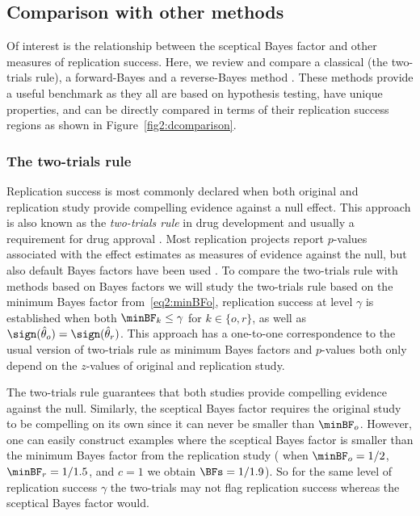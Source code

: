 \subsection{Comparison with other methods}
Of interest is the relationship between the sceptical Bayes factor and other
measures of replication success. Here, we review and compare a classical (the
two-trials rule), a forward-Bayes \citep[the replication Bayes factor
from][]{Verhagen2014} and a reverse-Bayes method \citep[the sceptical $p$-value
from][]{Held2020}. These methods provide a useful benchmark as they all are
based on hypothesis testing, have unique properties, and can be directly
compared in terms of their replication success regions as shown in
Figure~\ref{fig2:dcomparison}.


\subsubsection{The two-trials rule}
Replication success is most commonly declared when both original and replication
study provide compelling evidence against a null effect. This approach is also
known as the \emph{two-trials rule} in drug development and usually a
requirement for drug approval \citep[Section 9.4]{Kay2015}. Most replication
projects report $p$-values associated with the effect estimates as measures of
evidence against the null, but also default Bayes factors have been used
\citep[see \eg{} the Bayesian supplement of][]{Camerer2018}. To compare the
two-trials rule with methods based on Bayes factors we will study the two-trials
rule based on the minimum Bayes factor from~\eqref{eq2:minBFo}, \ie{} replication
success at level $\gamma$ is established when both
$\minBF_{k} %
\leq \gamma$ for $k \in \{o, r\}$, as well as
$\sign(\hat{\theta}_o) = \sign(\hat{\theta}_r)$. This approach has a one-to-one
correspondence to the usual version of two-trials rule as minimum Bayes factors
and $p$-values both only depend on the $z$-values of original and replication
study.



The two-trials rule guarantees that both studies provide compelling evidence
against the null. Similarly, the sceptical Bayes factor requires the original
study to be compelling on its own since it can never be smaller than
$\minBF_{o}$. However, one can easily construct examples where the sceptical
Bayes factor is smaller than the minimum Bayes factor from the replication study
(\eg{} when $\minBF_{o} = 1/2$,
$\minBF_{r} = 1/1.5$, and $c = 1$
we obtain $\BFs = 1/1.9$). So for the same level of
replication success $\gamma$ the two-trials may not flag replication success
whereas the sceptical Bayes factor would.

